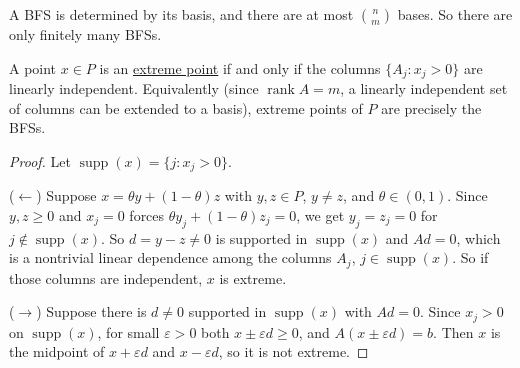	A BFS is determined by its basis, and there are at most $\binom{n}{m}$ bases. So there are only finitely many BFSs. 

	\begin{lemma}
	  \label{thm:extreme-points-are-basic-feasible-solutions}
		A point $x \in P$ is an \hyperref[alg-def:extreme-point]{extreme point} if and only if the columns $\{A_j \colon x_j > 0\}$ are linearly independent. Equivalently (since $\operatorname{rank} A = m$, a linearly independent set of columns can be extended to a basis), extreme points of $P$ are precisely the BFSs. 
	\end{lemma}
	\begin{proof}
		Let $\operatorname{supp}(x) = \{j \colon x_j > 0\}$. 

		($\leftarrow$) Suppose $x = \theta y + (1 - \theta) z$ with $y, z \in P$, $y \neq z$, and $\theta \in (0, 1)$. Since $y, z \geq 0$ and $x_j = 0$ forces $\theta y_j + (1 - \theta) z_j = 0$, we get $y_j = z_j = 0$ for $j \notin \operatorname{supp}(x)$. So $d = y - z \neq 0$ is supported in $\operatorname{supp}(x)$ and $Ad = 0$, which is a nontrivial linear dependence among the columns $A_j$, $j \in \operatorname{supp}(x)$. So if those columns are independent, $x$ is extreme. 

		($\rightarrow$) Suppose there is $d \neq 0$ supported in $\operatorname{supp}(x)$ with $Ad = 0$. Since $x_j > 0$ on $\operatorname{supp}(x)$, for small $\varepsilon > 0$ both $x \pm \varepsilon d \geq 0$, and $A(x \pm \varepsilon d) = b$. Then $x$ is the midpoint of $x + \varepsilon d$ and $x - \varepsilon d$, so it is not extreme. 
	\end{proof}

